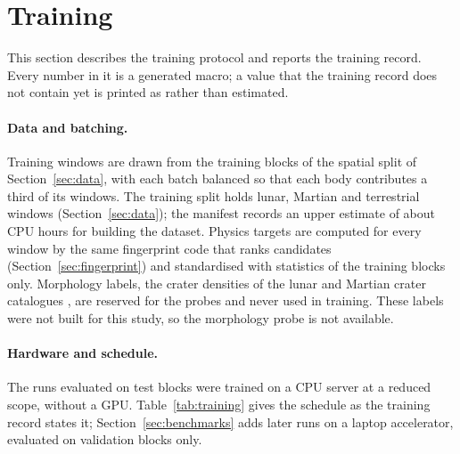 \section{Training}
\label{sec:training}

This section describes the training protocol and reports the training record. Every number in it
is a generated macro; a value that the training record does not contain yet is printed as
\NotAvailable{} rather than estimated.

\paragraph{Data and batching.} Training windows are drawn from the training blocks of the spatial
split of Section~\ref{sec:data}, with each batch balanced so that each body contributes a third of
its windows. The training split holds \DatasetMoonWindows{} lunar, \DatasetMarsWindows{} Martian and \DatasetEarthWindows{} terrestrial windows (Section~\ref{sec:data}); the manifest records an upper estimate of about \DatasetCpuHours{} CPU hours for building the dataset. Physics targets are computed for every window by the same fingerprint code that ranks
candidates (Section~\ref{sec:fingerprint}) and standardised with statistics of the training blocks
only. Morphology labels, the crater densities of the lunar and Martian crater catalogues \citep{robbins2019,robbins2012}, are reserved for the probes and never used in training. These labels were not built for this study, so the morphology probe is not available.

\paragraph{Hardware and schedule.} The runs evaluated on test blocks were trained on a CPU server at a reduced scope, without a GPU. Table~\ref{tab:training} gives the schedule as the training record states it; Section~\ref{sec:benchmarks} adds later runs on a laptop accelerator, evaluated on validation blocks only.

